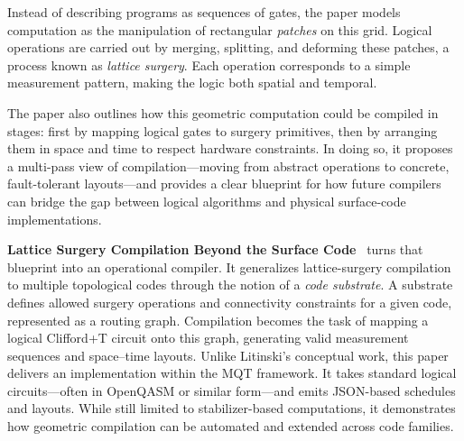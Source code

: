 Instead of describing programs as sequences of gates, the paper models computation as the manipulation of rectangular \emph{patches} on this grid. Logical operations are carried out by merging, splitting, and deforming these patches, a process known as \textit{lattice surgery}. Each operation corresponds to a simple measurement pattern, making the logic both spatial and temporal.

The paper also outlines how this geometric computation could be compiled in stages: first by mapping logical gates to surgery primitives, then by arranging them in space and time to respect hardware constraints. In doing so, it proposes a multi-pass view of compilation—moving from abstract operations to concrete, fault-tolerant layouts—and provides a clear blueprint for how future compilers can bridge the gap between logical algorithms and physical surface-code implementations.

\textbf{Lattice Surgery Compilation Beyond the Surface Code}~\cite{herzog2025latticesurgerycompilationsurface} turns that blueprint into an operational compiler. It generalizes lattice-surgery compilation to multiple topological codes through the notion of a \emph{code substrate}.
A substrate defines allowed surgery operations and connectivity constraints for a given code, represented as a routing graph. Compilation becomes the task of mapping a logical Clifford+T circuit onto this graph, generating valid measurement sequences and space–time layouts.
Unlike Litinski’s conceptual work, this paper delivers an implementation within the MQT framework. It takes standard logical circuits—often in OpenQASM or similar form—and emits JSON-based schedules and layouts.
While still limited to stabilizer-based computations, it demonstrates how geometric compilation can be automated and extended across code families. 
